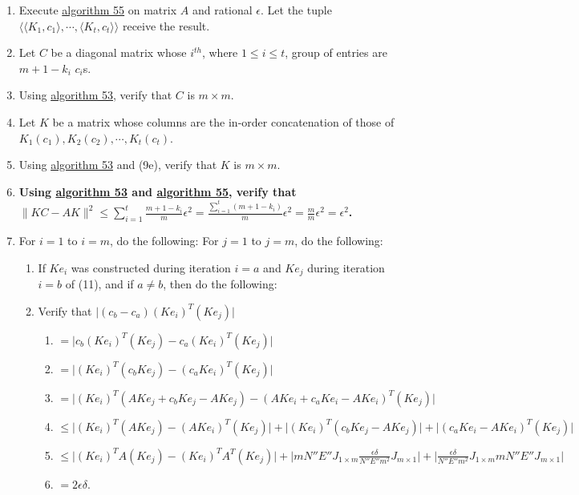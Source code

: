 \documentclass[twocolumn]{article}
\begin{document}
			\begin{enumerate}
				\item Execute \hyperref[sec:algorithm 55]{algorithm 55} on matrix $A$ and rational $\epsilon$. Let the tuple $\langle\langle K_1,c_1\rangle,\cdots,\langle K_t,c_t\rangle\rangle$ receive the result.
				\item Let $C$ be a diagonal matrix whose $i^{th}$, where $1\le i\le t$, group of entries are $m+1-k_i$ $c_i$s.
				\item Using \hyperref[sec:algorithm 53]{algorithm 53}, verify that $C$ is $m\times m$.
				\item Let $K$ be a matrix whose columns are the in-order concatenation of those of $K_1(c_1),K_2(c_2),\cdots,K_t(c_t)$.
				\item Using \hyperref[sec:algorithm 53]{algorithm 53} and (9e), verify that $K$ is $m\times m$.
				\item \textbf{Using \hyperref[sec:algorithm 53]{algorithm 53} and \hyperref[sec:algorithm 55]{algorithm 55}, verify that $\lVert KC-AK\rVert^2\le\sum_{i=1}^t\frac{m+1-k_i}{m}\epsilon^2=\frac{\sum_{i=1}^t (m+1-k_i)}{m}\epsilon^2=\frac{m}{m}\epsilon^2=\epsilon^2$.}
				\item For $i=1$ to $i=m$, do the following: For $j=1$ to $j=m$, do the following:
				\begin{enumerate}
					\item If $Ke_i$ was constructed during iteration $i=a$ and $Ke_j$ during iteration $i=b$ of (11), and if $a\ne b$, then do the following:
					\item Verify that $\lvert(c_b-c_a)(Ke_i)^T(Ke_j)\rvert$
					\begin{enumerate}
						\item $=\lvert c_b(Ke_i)^T(Ke_j)-c_a(Ke_i)^T(Ke_j)\rvert$
						\item $=\lvert(Ke_i)^T(c_bKe_j)-(c_aKe_i)^T(Ke_j)\rvert$
						\item $=\lvert(Ke_i)^T(AKe_j+c_bKe_j-AKe_j)-(AKe_i+c_aKe_i-AKe_i)^T(Ke_j)\rvert$
						\item $\le\lvert(Ke_i)^T(AKe_j)-(AKe_i)^T(Ke_j)\rvert+\lvert(Ke_i)^T(c_bKe_j-AKe_j)\rvert+\lvert(c_aKe_i-AKe_i)^T(Ke_j)\rvert$
						\item $\le\lvert(Ke_i)^TA(Ke_j)-(Ke_i)^TA^T(Ke_j)\rvert+\lvert mN''E''J_{1\times m}\frac{\epsilon\delta}{N''E''m^2}J_{m\times 1}\rvert+\lvert\frac{\epsilon\delta}{N''E''m^2}J_{1\times m}mN''E''J_{m\times 1}\rvert$
						\item $=2\epsilon\delta$.
					\end{enumerate}

\end{enumerate}
\end{enumerate}
\end{document}
